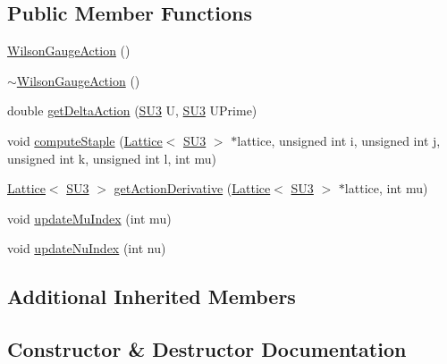 \subsection*{Public Member Functions}
\begin{DoxyCompactItemize}
\item 
\mbox{\hyperlink{class_wilson_gauge_action_a50d06446cf93f7e738e88c372920f518}{Wilson\+Gauge\+Action}} ()
\item 
\mbox{\hyperlink{class_wilson_gauge_action_a0995cd407b76b4f5d035659718591c11}{$\sim$\+Wilson\+Gauge\+Action}} ()
\item 
double \mbox{\hyperlink{class_wilson_gauge_action_a60f2892e61489004df3cde6cc856b00b}{get\+Delta\+Action}} (\mbox{\hyperlink{class_s_u3}{S\+U3}} U, \mbox{\hyperlink{class_s_u3}{S\+U3}} U\+Prime)
\item 
void \mbox{\hyperlink{class_wilson_gauge_action_af1f6ba42fcc2b923dc3b37bf150bfae9}{compute\+Staple}} (\mbox{\hyperlink{class_lattice}{Lattice}}$<$ \mbox{\hyperlink{class_s_u3}{S\+U3}} $>$ $\ast$lattice, unsigned int i, unsigned int j, unsigned int k, unsigned int l, int mu)
\item 
\mbox{\hyperlink{class_lattice}{Lattice}}$<$ \mbox{\hyperlink{class_s_u3}{S\+U3}} $>$ \mbox{\hyperlink{class_wilson_gauge_action_a43cf939cd53495b7225fbeaa8a0ff6e8}{get\+Action\+Derivative}} (\mbox{\hyperlink{class_lattice}{Lattice}}$<$ \mbox{\hyperlink{class_s_u3}{S\+U3}} $>$ $\ast$lattice, int mu)
\item 
void \mbox{\hyperlink{class_wilson_gauge_action_ab7ed4ab8e475f5a188cd19ce720a5eb9}{update\+Mu\+Index}} (int mu)
\item 
void \mbox{\hyperlink{class_wilson_gauge_action_a010b3b8870476dfec4c48a01b6d6fc1d}{update\+Nu\+Index}} (int nu)
\end{DoxyCompactItemize}
\subsection*{Additional Inherited Members}


\subsection{Constructor \& Destructor Documentation}
\mbox{\label{class_wilson_gauge_action_a50d06446cf93f7e738e88c372920f518}} 
